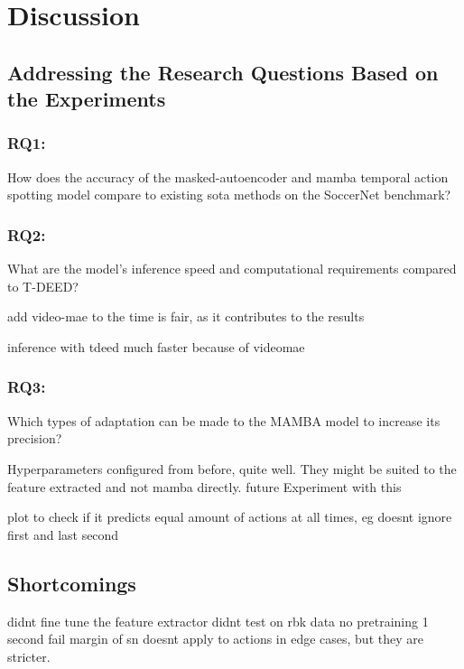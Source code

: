 \chapter{Discussion}
\label{chap:discussion}

\section{Addressing the Research Questions Based on the Experiments}


\subsection{RQ1:} 
How does the accuracy of the masked-autoencoder and mamba temporal action spotting model compare to existing \acrlong{sota} methods on the SoccerNet benchmark?
\subsection{RQ2:} 
What are the model’s inference speed and computational requirements compared to T-DEED?

add video-mae to the time is fair, as it contributes to the results

inference with tdeed much faster because of videomae
\subsection{RQ3:}
Which types of adaptation can be made to the MAMBA model to increase its precision?

Hyperparameters configured from before, quite well. 
They might be suited to the feature extracted and not mamba directly. 
future Experiment with this


plot to check if it predicts equal amount of actions at all times, eg doesnt ignore first and last second 

\section{Shortcomings}
didnt fine tune the feature extractor
didnt test on rbk data
no pretraining
1 second fail margin of sn doesnt apply to actions in edge cases, but they are stricter. 


